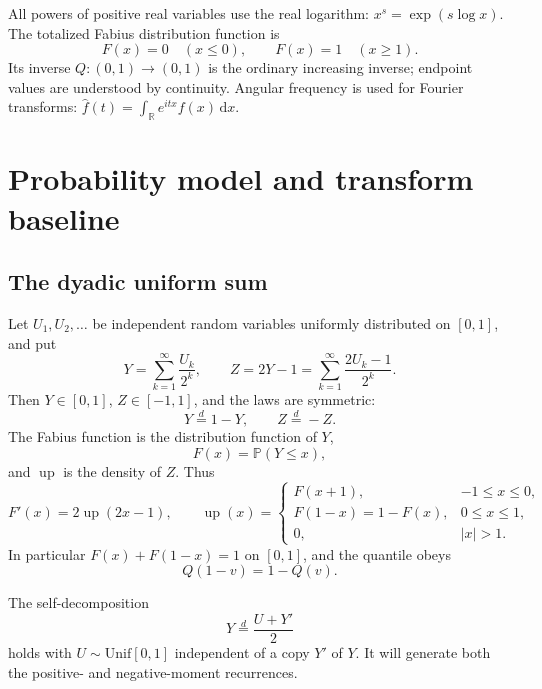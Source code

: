 \documentclass[11pt,oneside]{article}
\theoremstyle{definition}
\newcommand{\F}{F}
\newcommand{\Q}{Q}
\newcommand{\upf}{\operatorname{up}}
\newcommand{\Prob}{\mathbb P}
\newcommand{\R}{\mathbb R}
\newcommand{\dd}{\,\mathrm d}
\begin{document}
All powers of positive real variables use the real logarithm:
\(x^s=\exp(s\log x)\).  The totalized Fabius distribution function is
\[
 \F(x)=0\quad(x\le0),\qquad \F(x)=1\quad(x\ge1).
\]
Its inverse \(\Q:(0,1)\to(0,1)\) is the ordinary increasing inverse; endpoint values
are understood by continuity.  Angular frequency is used for Fourier transforms:
\(\widehat f(t)=\int_\R e^{itx}f(x)\dd x\).

\section{Probability model and transform baseline}

\subsection{The dyadic uniform sum}

Let \(U_1,U_2,\ldots\) be independent random variables uniformly distributed on
\([0,1]\), and put
\begin{equation}\label{eq:Ydef}
 Y=\sum_{k=1}^{\infty}\frac{U_k}{2^k},
 \qquad
 Z=2Y-1=\sum_{k=1}^{\infty}\frac{2U_k-1}{2^k}.
\end{equation}
Then \(Y\in[0,1]\), \(Z\in[-1,1]\), and the laws are symmetric:
\begin{equation}\label{eq:symmetry-laws}
 Y\overset d=1-Y,
 \qquad Z\overset d=-Z.
\end{equation}
The Fabius function is the distribution function of \(Y\),
\begin{equation}\label{eq:Fdist}
 \F(x)=\Prob(Y\le x),
\end{equation}
and \(\upf\) is the density of \(Z\).  Thus
\begin{equation}\label{eq:F-up-relations}
 \F'(x)=2\upf(2x-1),\qquad
 \upf(x)=
 \begin{cases}
   \F(x+1),&-1\le x\le0,\\
   \F(1-x)=1-\F(x),&0\le x\le1,\\
   0,&|x|>1.
 \end{cases}
\end{equation}
In particular \(\F(x)+\F(1-x)=1\) on \([0,1]\), and the quantile obeys
\begin{equation}\label{eq:Qsymmetry}
 \Q(1-v)=1-\Q(v).
\end{equation}

The self-decomposition
\begin{equation}\label{eq:smoothing}
 Y\overset d=\frac{U+Y'}2
\end{equation}
holds with \(U\sim\mathrm{Unif}[0,1]\) independent of a copy \(Y'\) of \(Y\).
It will generate both the positive- and negative-moment recurrences.
\end{document}

